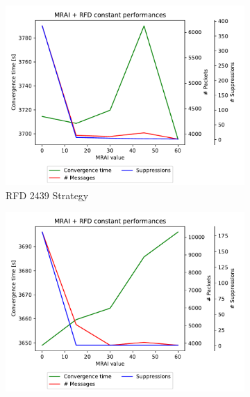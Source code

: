 \begin{figure}[h]
     \centering
     \begin{subfigure}[b]{0.49\textwidth}
         \centering
         \includegraphics[width=\textwidth]{images/RFD/miceVSelephants/MultiMRAI/elephants/cisco_1000_RFD_2439-constant_mrai_rfd_evolution.pdf}
         \caption{RFD 2439 Strategy}
         \label{fig:1000_2439RFD_multiMRAI_elephants}
     \end{subfigure}
     \hfill
     \begin{subfigure}[b]{0.49\textwidth}
         \centering
         \includegraphics[width=\textwidth]{images/RFD/miceVSelephants/MultiMRAI/elephants/cisco_1000_RFD_7196_aggressive-constant_mrai_rfd_evolution.pdf}

\end{subfigure}
\end{figure}
